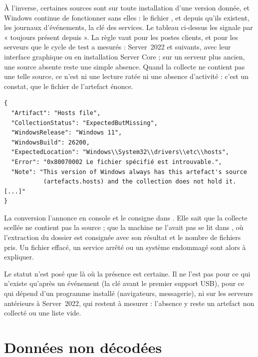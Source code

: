 \documentclass[11pt,a4paper,oneside]{report}
\begin{document}
À l'inverse, certaines sources sont sur toute installation d'une version
donnée, et Windows continue de fonctionner sans elles : le fichier
,  et  depuis qu'ils
existent, les journaux d'événements, la clé des services. Le tableau ci-dessus
les signale par « toujours présent depuis ». La règle vaut pour les postes
clients, et pour les serveurs que le cycle de test a mesurés : Server~2022 et
suivants, avec leur interface graphique ou en installation Server Core ; sur un
serveur plus ancien, une source absente reste une simple absence. Quand la collecte ne contient pas
une telle source, ce n'est ni une lecture ratée ni une absence d'activité :
c'est un constat, que le fichier de l'artefact énonce.

\begin{lstlisting}
{
  "Artifact": "Hosts file",
  "CollectionStatus": "ExpectedButMissing",
  "WindowsRelease": "Windows 11",
  "WindowsBuild": 26200,
  "ExpectedLocation": "Windows\\System32\\drivers\\etc\\hosts",
  "Error": "0x80070002 Le fichier spécifié est introuvable.",
  "Note": "This version of Windows always has this artefact's source
           (artefacts.hosts) and the collection does not hold it. [...]"
}
\end{lstlisting}

La conversion l'annonce en console et le consigne dans
. Elle sait que la collecte scellée ne contient pas la
source ; que la machine ne l'avait pas se lit dans ,
où l'extraction du dossier est consignée avec son résultat et le nombre de
fichiers pris. Un fichier effacé, un service arrêté ou un système endommagé
sont alors à expliquer.

\begin{attention}
Le statut n'est posé que là où la présence est certaine. Il ne l'est pas pour
ce qui n'existe qu'après un événement (la clé  avant le premier
support USB), pour ce qui dépend d'un programme installé (navigateurs,
messagerie), ni sur les serveurs antérieurs à Server~2022, qui restent à
mesurer : l'absence y reste un artefact non collecté ou une liste vide.
\end{attention}

\section{Données non décodées}
\end{document}
